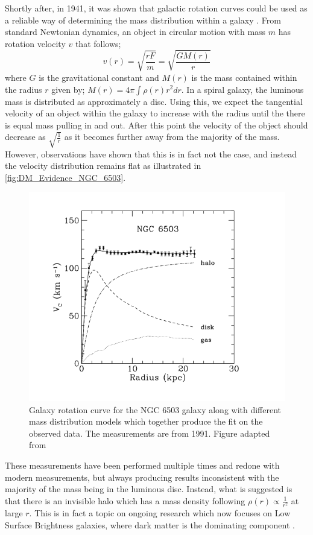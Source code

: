 \par
Shortly after, in 1941, it was shown that galactic rotation curves could be used as a reliable way of determining the mass distribution within a galaxy \cite{Chandrasekhar_1941_ref}.
From standard Newtonian dynamics, an object in circular motion with mass $m$ has rotation velocity $v$ that follows;
\begin{equation}
    v(r) = \sqrt{\frac{rF}{m}} = \sqrt{\frac{GM(r)}{r}}
    \label{eq:Kepler_Motion}
\end{equation}
where $G$ is the gravitational constant and $M(r)$ is the mass contained within the radius $r$ given by; $M(r) = 4 \pi \int \rho(r) r^{2} dr$.
In a spiral galaxy, the luminous mass is distributed as approximately a disc. 
Using this, we expect the tangential velocity of an object within the galaxy to increase with the radius until the there is equal mass pulling in and out.
After this point the velocity of the object should decrease as $\sqrt{\frac{1}{r}}$ as it becomes further away from the majority of the mass.
However, observations have shown that this is in fact not the case, and instead the velocity distribution remains flat as illustrated in \autoref{fig:DM_Evidence_NGC_6503}.
\begin{figure}[!htbp]%
    \centering
    \includegraphics[scale=1.0]{Figures/DarkMatterEvidence/NGC_6503_galaxy_speed.png}
    \caption[Galaxy rotation curve for the NGC 6503 galaxy]{Galaxy rotation curve for the NGC 6503 galaxy along with different mass distribution models which together produce the fit on the observed data. The measurements are from 1991. Figure adapted from \cite{NGC_6503_galaxy_rotation_ref}}
    \label{fig:DM_Evidence_NGC_6503}
\end{figure}
These measurements have been performed multiple times and redone with modern measurements, but always producing results inconsistent with the majority of the mass being in the luminous disc.
Instead, what is suggested is that there is an invisible halo which has a mass density following $\rho(r) \propto \frac{1}{r^2}$ at large $r$.
This is in fact a topic on ongoing research which now focuses on Low Surface Brightness galaxies, where dark matter is the dominating component \cite{MHONGOOSE_2018_ref}.



